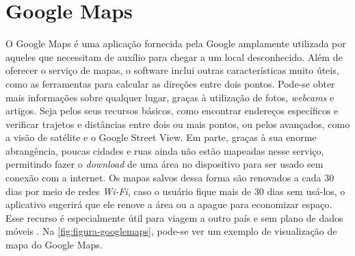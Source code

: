 \section{Google Maps}


O Google Maps é uma aplicação fornecida pela Google amplamente utilizada por aqueles que necessitam de auxílio para chegar a um local desconhecido. Além de oferecer o serviço de mapas, o software inclui outras características muito úteis, como as ferramentas para calcular as direções entre dois pontos. Pode-se obter mais informações sobre qualquer lugar, graças à utilização de fotos, \textit{webcams} e artigos. Seja pelos seus recursos básicos, como encontrar endereços específicos e verificar trajetos e distâncias entre dois ou mais pontos, ou pelos avançados, como a visão de satélite e o Google Street View. Em parte, graças à sua enorme abrangência, poucas cidades e ruas ainda não estão mapeadas nesse serviço, permitindo fazer o \textit{download} de uma área no dispositivo para ser usado sem conexão com a internet. Os mapas salvos dessa forma são renovados a cada 30 dias por meio de redes \textit{Wi-Fi}, caso o usuário fique mais de 30 dias sem usá-los, o aplicativo sugerirá que ele renove a área ou a apague para economizar espaço. Esse recurso é especialmente útil para viagem a outro país e sem plano de dados móveis \cite{google:2019}. Na \autoref{fig:figura-googlemaps}, pode-se ver um exemplo de visualização de mapa do Google Maps.

